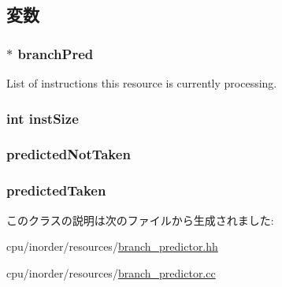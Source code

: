 \subsection{変数}
\hypertarget{classBranchPredictor_adee29d0de843b42df1f1caf92d388413}{
\subsubsection[{branchPred}]{$\ast$ {\bf branchPred}}}
\label{classBranchPredictor_adee29d0de843b42df1f1caf92d388413}
List of instructions this resource is currently processing. \hypertarget{classBranchPredictor_a494a9a986bc62c946604f9e9047ad237}{
\subsubsection[{instSize}]{\setlength{\rightskip}{0pt plus 5cm}int {\bf instSize}}}
\label{classBranchPredictor_a494a9a986bc62c946604f9e9047ad237}
\hypertarget{classBranchPredictor_ae27736a1ae544674fb4449cc6d8b432c}{
\subsubsection[{predictedNotTaken}]{ {\bf predictedNotTaken}}}
\label{classBranchPredictor_ae27736a1ae544674fb4449cc6d8b432c}
\hypertarget{classBranchPredictor_ada70fcd9e8038f515744ad60fcbb2cad}{
\subsubsection[{predictedTaken}]{ {\bf predictedTaken}}}
\label{classBranchPredictor_ada70fcd9e8038f515744ad60fcbb2cad}


このクラスの説明は次のファイルから生成されました:\begin{DoxyCompactItemize}
\item 
cpu/inorder/resources/\hyperlink{branch__predictor_8hh}{branch\_\-predictor.hh}\item 
cpu/inorder/resources/\hyperlink{branch__predictor_8cc}{branch\_\-predictor.cc}\end{DoxyCompactItemize}
